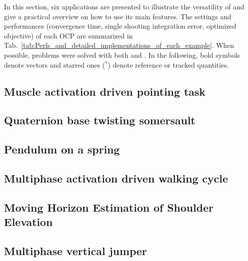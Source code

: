 In this section, six applications are presented to illustrate the versatility of \bioptim and give a practical overview on how to use its main features.
The settings and performances (convergence time, single shooting integration error, optimized objective) of each OCP are summarized in Tab.~\ref{tab:Perfs_and_detailed_implementations_of_each_example}. 
When possible, problems were solved with both \ipopt and \acados.
In the following, bold symbols denote vectors and starred ones ($^*$) denote reference or tracked quantities.


\subsection{Muscle activation driven pointing task}\label{ex:poiting}


\subsection{Quaternion base twisting somersault}\label{ex:somersault}


\subsection{Pendulum on a spring}\label{ex:spring}


\subsection{Multiphase activation driven walking cycle}\label{ex:walking}


\subsection{Moving Horizon Estimation of Shoulder Elevation}\label{ex:mhe}


\subsection{Multiphase vertical jumper}\label{ex:jump}

%

